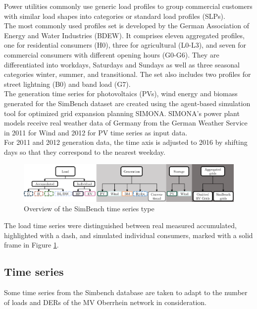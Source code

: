 Power utilities commonly use generic load profiles to group commercial customers with similar load shapes into categories or standard load profiles (\glspl{SLP}). \\
The most commonly used profiles set is developed by the German Association of Energy and Water Industries (BDEW). It comprises eleven aggregated profiles, one for residential consumers (H0), three for agricultural (L0-L3), and seven for commercial consumers with different opening hours (G0-G6). They are differentiated into workdays, Saturdays and Sundays as well as three seasonal categories winter, summer, and transitional. The set also includes two profiles for street lightning (B0) and band load (G7). \\
The generation time series for photovoltaics (\glspl{PV}), wind energy and biomass generated for the SimBench dataset are created using the agent-based simulation tool for optimized grid expansion planning SIMONA. SIMONA's power plant models receive real weather data of Germany from the German Weather Service in 2011 for Wind and 2012 for \gls{PV} time series as input data. \\
For 2011 and 2012 generation data, the time axis is adjusted to 2016 by shifting days so that they correspond to the nearest weekday\cite{Simbenchds1}.\\

\begin{figure}[h]
\centering
    \includegraphics[width=.8\linewidth]{images/MVOberr/SimBench time series types.PNG}
\caption{Overview of the SimBench time series type}
\label{fig:SBtimeseriestype}
\end{figure}

The load time series were distinguished between real measured accumulated, highlighted with a dash, and simulated individual consumers, marked with a solid frame in Figure \ref{fig:SBtimeseriestype}. \\

\subsection{Time series}
\label{ts}
Some time series from the Simbench database are taken to adapt to the number of loads and \glspl{DER} of the MV Oberrhein network in consideration. \\

